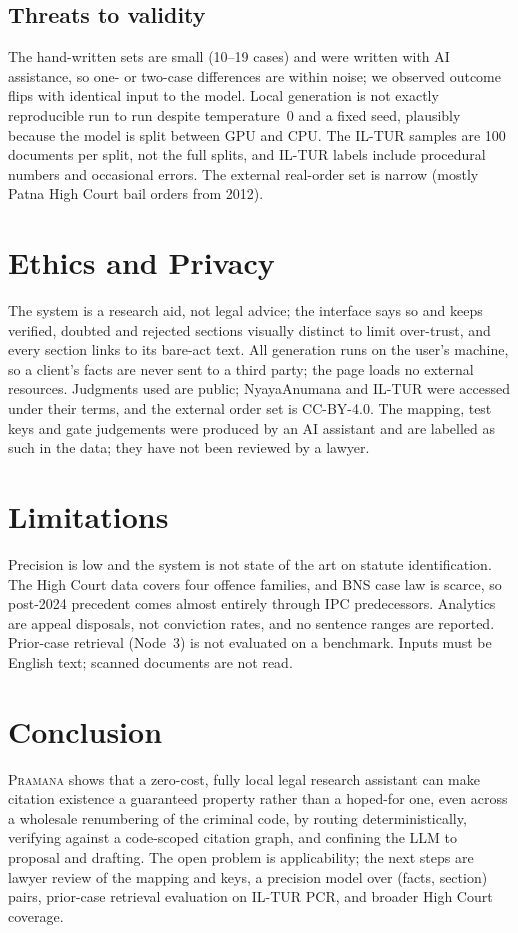 \documentclass[conference]{IEEEtran}
\newcommand{\sys}{\textsc{Pramana}\xspace}
\begin{document}
\subsection{Threats to validity}
The hand-written sets are small (10--19 cases) and were written with AI assistance, so one- or two-case differences are within noise; we observed outcome flips with identical input to the model. Local generation is not exactly reproducible run to run despite temperature~0 and a fixed seed, plausibly because the model is split between GPU and CPU. The IL-TUR samples are 100 documents per split, not the full splits, and IL-TUR labels include procedural numbers and occasional errors. The external real-order set is narrow (mostly Patna High Court bail orders from 2012).

\section{Ethics and Privacy}
The system is a research aid, not legal advice; the interface says so and keeps verified, doubted and rejected sections visually distinct to limit over-trust, and every section links to its bare-act text. All generation runs on the user's machine, so a client's facts are never sent to a third party; the page loads no external resources. Judgments used are public; NyayaAnumana and IL-TUR were accessed under their terms, and the external order set is CC-BY-4.0. The mapping, test keys and gate judgements were produced by an AI assistant and are labelled as such in the data; they have not been reviewed by a lawyer.

\section{Limitations}
Precision is low and the system is not state of the art on statute identification. The High Court data covers four offence families, and BNS case law is scarce, so post-2024 precedent comes almost entirely through IPC predecessors. Analytics are appeal disposals, not conviction rates, and no sentence ranges are reported. Prior-case retrieval (Node~3) is not evaluated on a benchmark. Inputs must be English text; scanned documents are not read.

\section{Conclusion}
\sys shows that a zero-cost, fully local legal research assistant can make citation existence a guaranteed property rather than a hoped-for one, even across a wholesale renumbering of the criminal code, by routing deterministically, verifying against a code-scoped citation graph, and confining the LLM to proposal and drafting. The open problem is applicability; the next steps are lawyer review of the mapping and keys, a precision model over (facts, section) pairs, prior-case retrieval evaluation on IL-TUR PCR, and broader High Court coverage.
\end{document}
